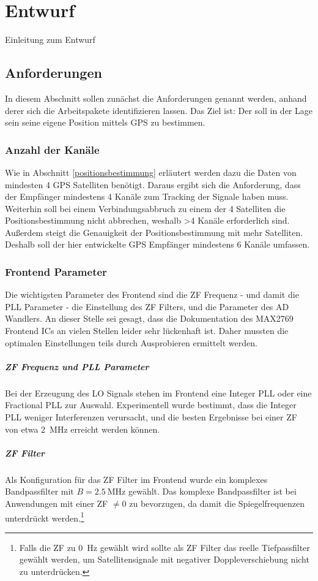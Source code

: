 \chapter{Entwurf}
Einleitung zum Entwurf

\section{Anforderungen}
In diesem Abschnitt sollen zunächst die Anforderungen genannt werden, anhand derer sich die Arbeitspakete identifizieren lassen. Das Ziel ist: Der \dscubesat soll in der Lage sein seine eigene Position mittels GPS zu bestimmen.  

\subsection{Anzahl der Kanäle} Wie in Abschnitt \ref{positionsbestimmung} erläutert werden dazu die Daten von mindesten 4 GPS Satelliten benötigt. Daraus ergibt sich die Anforderung, dass der Empfänger mindestens 4 Kanäle zum Tracking der Signale haben muss. Weiterhin soll bei einem Verbindungsabbruch zu einem der 4 Satelliten die Positionsbestimmung nicht abbrechen, weshalb >4 Kanäle erforderlich sind. Außerdem steigt die Genauigkeit der Positionsbestimmung mit mehr Satelliten. Deshalb soll der hier entwickelte GPS Empfänger mindestens 6 Kanäle umfassen.

\subsection{Frontend Parameter}
Die wichtigsten Parameter des Frontend sind die ZF Frequenz - und damit die PLL Parameter - die Einstellung des ZF Filters, und die Parameter des AD Wandlers. An dieser Stelle sei gesagt, dass die Dokumentation des MAX2769 Frontend ICs an vielen Stellen leider sehr lückenhaft ist. Daher mussten die optimalen Einstellungen teils durch Ausprobieren ermittelt werden.

\paragraph{ZF Frequenz und PLL Parameter}
Bei der Erzeugung des LO Signals stehen im Frontend eine Integer PLL oder eine Fractional PLL zur Auswahl. Experimentell wurde bestimmt, dass die Integer PLL weniger Interferenzen verursacht, und die besten Ergebnisse bei einer ZF von etwa \SI{2}{\MHz} erreicht werden können. 

\paragraph{ZF Filter}
Als Konfiguration für das ZF Filter im Frontend wurde ein komplexes Bandpassfilter mit $B=\SI{2.5}{\MHz}$ gewählt. Das komplexe Bandpassfilter ist bei Anwendungen mit einer ZF $\neq 0$ zu bevorzugen, da damit die Spiegelfrequenzen unterdrückt werden.\footnote{Falls die ZF zu \SI{0}{\Hz} gewählt wird sollte als ZF Filter das reelle Tiefpassfilter gewählt werden, um Satellitensignale mit negativer Doppleverschiebung nicht zu unterdrücken.}

